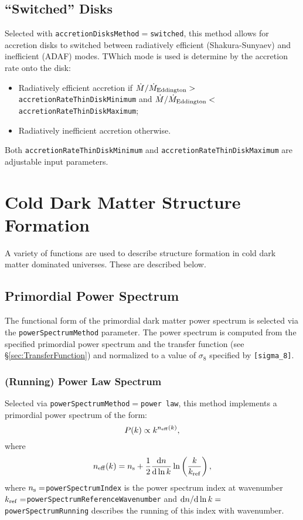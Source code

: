 \subsection{``Switched'' Disks}

Selected with {\tt accretionDisksMethod}$=${\tt switched}, this method allows for accretion disks to switched between radiatively efficient (Shakura-Sunyaev) and inefficient (ADAF) modes. TWhich mode is used is determine by the accretion rate onto the disk:
\begin{itemize}
 \item Radiatively efficient accretion if $\dot{M}/\dot{M}_{\rm Eddington}>${\tt accretionRateThinDiskMinimum} and $\dot{M}/\dot{M}_{\rm Eddington}<${\tt accretionRateThinDiskMaximum};
 \item Radiatively inefficient accretion otherwise.
\end{itemize}
Both {\tt accretionRateThinDiskMinimum} and {\tt accretionRateThinDiskMaximum} are adjustable input parameters.

\section{Cold Dark Matter Structure Formation}

A variety of functions are used to describe structure formation in cold dark matter dominated universes. These are described below.

\subsection{Primordial Power Spectrum}\label{sec:PrimordialPowerSpectrum}

The functional form of the primordial dark matter power spectrum is selected via the {\tt powerSpectrumMethod} parameter. The power spectrum is computed from the specified primordial power spectrum and the transfer function (see \S\ref{sec:TransferFunction}) and normalized to a value of $\sigma_8$ specified by {\tt [sigma\_8]}.

\subsubsection{(Running) Power Law Spectrum}

Selected via {\tt powerSpectrumMethod}$=${\tt power law}, this method implements a primordial power spectrum of the form:
\begin{equation}
 P(k) \propto k^{n_{\rm eff}(k)},
\end{equation}
where
\begin{equation}
 n_{\rm eff}(k) = n_{\rm s} + {1\over 2}{\d n \over \d \ln k} \ln \left( {k \over k_{\rm ref}} \right),
\end{equation}
where $n_{\rm s}=${\tt powerSpectrumIndex} is the power spectrum index at wavenumber $k_{\rm ref}=${\tt powerSpectrumReferenceWavenumber} and $\d n / \d \ln k=${\tt powerSpectrumRunning} describes the running of this index with wavenumber.

